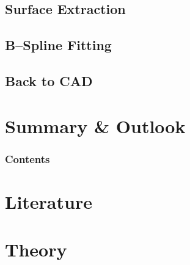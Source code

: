 \documentclass[9pt,pdftex]{beamer}
\begin{document}
%


\subsection{Surface Extraction}



\subsection{B--Spline Fitting}


\subsection{Back to CAD}


\section{Summary \& Outlook}
  \begin{frame}
  \setcounter{tocdepth}{1}
  \frametitle{Contents}
  \end{frame}

%
\section*{Literature}

\section*{Theory}

\end{document}
